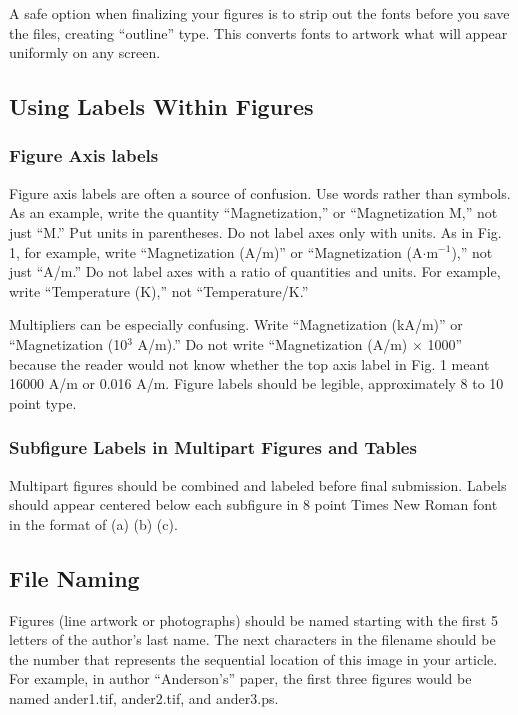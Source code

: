 \documentclass[twoside,web]{ieeecolor}
\begin{document}
A safe option when finalizing your figures is to strip out the fonts before 
you save the files, creating ``outline'' type. This converts fonts to 
artwork what will appear uniformly on any screen.

\subsection{Using Labels Within Figures}

\subsubsection{Figure Axis labels }
Figure axis labels are often a source of confusion. Use words rather than 
symbols. As an example, write the quantity ``Magnetization,'' or 
``Magnetization M,'' not just ``M.'' Put units in parentheses. Do not label 
axes only with units. As in Fig. 1, for example, write ``Magnetization 
(A/m)'' or ``Magnetization (A$\cdot$m$^{-1}$),'' not just ``A/m.'' Do not label axes with a ratio of quantities and 
units. For example, write ``Temperature (K),'' not ``Temperature/K.'' 

Multipliers can be especially confusing. Write ``Magnetization (kA/m)'' or 
``Magnetization (10$^{3}$ A/m).'' Do not write ``Magnetization 
(A/m)$\,\times\,$1000'' because the reader would not know whether the top 
axis label in Fig. 1 meant 16000 A/m or 0.016 A/m. Figure labels should be 
legible, approximately 8 to 10 point type.

\subsubsection{Subfigure Labels in Multipart Figures and Tables}
Multipart figures should be combined and labeled before final submission. 
Labels should appear centered below each subfigure in 8 point Times New 
Roman font in the format of (a) (b) (c). 

\subsection{File Naming}
Figures (line artwork or photographs) should be named starting with the 
first 5 letters of the author's last name. The next characters in the 
filename should be the number that represents the sequential 
location of this image in your article. For example, in author 
``Anderson's'' paper, the first three figures would be named ander1.tif, 
ander2.tif, and ander3.ps.
\end{document}
